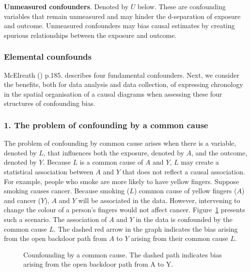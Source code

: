 \documentclass[
  singlecolumn]{article}
\begin{document}
\textbf{Unmeasured confounders}. Denoted by \(U\) below. These are
confounding variables that remain unmeasured and may hinder the
d-separation of exposure and outcome. Unmeasured confounders may bias
causal estimates by creating spurious relationships between the exposure
and outcome.

\subsubsection{Elemental counfounds}\label{elemental-counfounds}

McElreath () p.185. describes four
fundamental confounders. Next, we consider the benefits, both for data
analysis and data collection, of expressing chronology in the spatial
organisation of a causal diagrams when assessing these four structures
of confounding bias.

\subsubsection{1. The problem of confounding by a common
cause}\label{the-problem-of-confounding-by-a-common-cause}

The problem of confounding by common cause arises when there is a
variable, denoted by \(L\), that influences both the exposure, denoted
by \(A\), and the outcome, denoted by \(Y.\) Because \(L\) is a common
cause of \(A\) and \(Y\), \(L\) may create a statistical association
between \(A\) and \(Y\) that does not reflect a causal association. For
example, people who smoke are more likely to have yellow fingers.
Suppose smoking causes cancer. Because smoking (\(L\)) common cause of
yellow fingers (\(A\)) and cancer (\(Y\)), \(A\) and \(Y\) will be
associated in the data. However, intervening to change the colour of a
person's fingers would not affect cancer.
Figure~\ref{fig-dag-common-cause} presents such a scenario. The
association of \(A\) and \(Y\) in the data is confounded by the common
cause \(L\). The dashed red arrow in the graph indicates the bias
arising from the open backdoor path from \(A\) to \(Y\) arising from
their common cause \(L\).

\begin{figure}


\caption{\label{fig-dag-common-cause}Counfounding by a common cause. The
dashed path indicates bias arising from the open backdoor path from A to
Y.}

\end{figure}%
\end{document}
